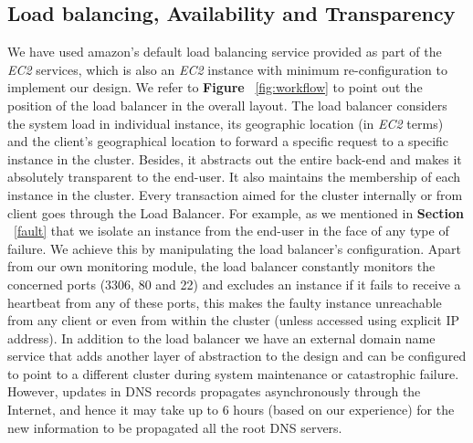 \documentclass[12pt]{article}
\begin{document}
\subsection{Load balancing, Availability and Transparency}
\label{lb.a.t} We have
used amazon's default load balancing service provided as part of the \emph{EC2}
services, which is also an \emph{EC2} instance with minimum re-configuration to
implement our design. We refer to \textbf{Figure }~\ref{fig:workflow} to point
out the position of the load balancer in the overall layout. The load balancer
considers the system load in individual instance, its geographic location (in
\emph{EC2} terms) and the client's geographical location to forward a specific
request to a specific instance in the cluster. Besides, it abstracts out the
entire back-end and makes it absolutely transparent to the end-user. It also
maintains the membership of each instance in the cluster. Every transaction
aimed for the cluster internally or from client goes through the Load Balancer.
For example, as we mentioned in \textbf{Section }~\ref{fault} that we isolate an
instance from the end-user in the face of any type of failure. We achieve this
by manipulating the load balancer's configuration. Apart from our own monitoring
module, the load balancer constantly monitors the concerned ports (3306, 80 and
22) and excludes an instance if it fails to receive a heartbeat from any of
these ports, this makes the faulty instance unreachable from any client or even
from within the cluster (unless accessed using explicit IP address). In addition
to the load balancer we have an external domain name service that adds another
layer of abstraction to the design and can be configured to point to a different
cluster during system maintenance or catastrophic failure. However, updates in
DNS records propagates asynchronously through the Internet, and hence it may
take up to 6 hours (based on our experience) for the new information to be
propagated all the root DNS servers.
\end{document}

